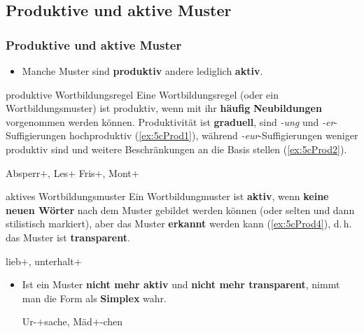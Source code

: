 \subsection{Produktive und aktive Muster}

\begin{frame}
\frametitle{Produktive und aktive Muster}

\begin{itemize}
\item Manche Muster sind \textbf{produktiv} andere lediglich \textbf{aktiv}.
\end{itemize}

\begin{block}{produktive Wortbildungsregel}
Eine Wortbildungsregel (oder ein Wortbildungsmuster) ist produktiv, wenn mit ihr \textbf{häufig} \textbf{Neubildungen} vorgenommen werden können. Produktivität ist \textbf{graduell}, \zB sind \emph{-ung} und \emph{-er}-Suffigierungen hochproduktiv (\ref{ex:5cProd1}), während \emph{-eur}-Suffigierungen weniger produktiv sind und weitere Beschränkungen an die Basis stellen (\ref{ex:5cProd2}). 
\hfill {}
\end{block}

\ea 
\ea \label{ex:5cProd1} Absperr$+$, Les$+$
\ex \label{ex:5cProd2} Fris$+$, Mont$+$ %
\z 
\z 

\end{frame}


\begin{frame}

\begin{block}{aktives Wortbildungsmuster}
Ein Wortbildungmuster ist \textbf{aktiv}, wenn \textbf{keine neuen Wörter} nach dem Muster gebildet werden können (oder selten und dann stilistisch markiert), aber das Muster \textbf{erkannt} werden kann (\ref{ex:5cProd4}), d.\,h. das Muster ist \textbf{transparent}.
\end{block}

\ea \label{ex:5cProd4} lieb$+$, unterhalt$+$
\z 

\begin{itemize}
\item Ist ein Muster \textbf{nicht mehr aktiv} und \textbf{nicht mehr transparent}, nimmt man die Form als \textbf{Simplex} wahr.

\ea Ur-$+$sache, Mäd$+$-chen
\z 
\end{itemize}

\end{frame}


